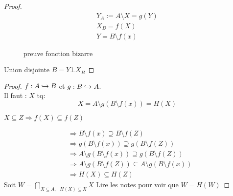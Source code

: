 \documentclass[../main.tex]{subfiles}
\begin{document}
\begin{proof}
\begin{align*}
	Y_A := A \setminus X = g(Y)\\
X_B = f(X)\\
Y = B \setminus f(x)
\end{align*}

\begin{figure}[ht]
    \centering
    \caption{preuve fonction bizarre}
    \label{fig:preuve-fonction-bizarre}
\end{figure}
Union disjointe $ B =Y \bot X_B$
\end{proof}
\begin{proof}
$f: A \hookrightarrow B$ et  $g: B \hookrightarrow A$.\\
Il faut : $X$ tq:
\[ 
	X = A \setminus g(B \setminus f(x)) = H(X)
\]

$X  \subseteq Z  \Rightarrow f(X) \subseteq f(Z)$

\begin{align*}
	&\Rightarrow B \setminus f(x) \supseteq B \setminus f(Z)\\
	&\Rightarrow g(B\setminus f(x)) \supseteq g(B \setminus f(Z))\\
	&\Rightarrow A \setminus g(B\setminus f(x)) \supseteq g(B \setminus f(Z))\\
	&\Rightarrow  A \setminus g(B\setminus f(Z)) \subseteq A \setminus g(B\setminus f(x))\\
	&\Rightarrow H(X) \subseteq H(Z)
\end{align*}
Soit $W = \bigcap_{X \subseteq A, \text{  } H(X) \subseteq X}X$ 
Lire les notes pour voir que $W = H(W)$

\end{proof}
\end{document}
